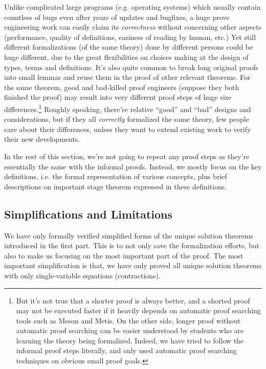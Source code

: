 \documentclass{eptcs} %
\theoremstyle{definition}
\theoremstyle{proposition}
\begin{document}
Unlike complicated large programs (e.g. operating systems) which
usually contain countless of bugs even after years of updates and
bugfixes, a huge prove engineering work can easily claim its
\emph{correctness} without concerning other aspects (performance,
quality of definitions, easiness of reading by human, etc.)
Yet still different formalizations (of the same theory) done by
different persons could be huge different, due to the great
flexibilities on choices making at the design of types, terms and
definitions. It's also quite common to break long original proofs into
small lemmas and reuse them in the proof of other relevant
theorems. For the same theorem, good and bad-killed proof engineers
(suppose they both finished the proof)
may result into very different proof steps of huge size
differences.\footnote{But it's not true that a shorter proof is always
better, and a shorted proof may not be executed faster if it heavily
depends on automatic proof searching tools such as Meson and Metis. On
the other side, longer proof without automatic proof searching can be
easier understood by students who are learning the theory being
formalized. Indeed, we have tried to follow the informal proof steps literally, and only used
automatic proof searching techniques on obvious small proof goals.}
Roughly speaking, there're relative ``good'' and ``bad'' designs and
considerations, but if they all \emph{correctly} formalized the same theory, few people
care about their differences, unless they want to extend existing work
to verify their new developments.

In the rest of this section, we're not going to repeat any proof steps
as they're essentially the same with the informal proofs. Instead, we
mostly focus on the key definitions, i.e. the formal
representation of various concepts, plus brief descriptions on
important stage theorem expressed in these definitions.

\subsection{Simplifications and Limitations}

We have only formally verified simplified forms of the unique
solution theorems introduced in the first part. This is to not only
save the formalization efforts, but also to make us focusing on the most
important part of the proof. The most important simplification is
that, we have only proved all unique solution theorems with only single-variable equations
(contractions).
\end{document}
